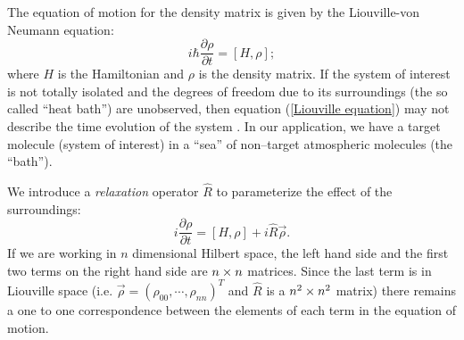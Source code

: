 \label{density formalism}
The equation of motion for the density matrix is given by the Liouville-von Neumann equation:
\begin{equation}
i \hbar \frac{\partial \rho}{\partial t}
=
[H, \rho];
\label{Liouville equation}
\end{equation}
where $H$ is the Hamiltonian and $\rho$ is the density matrix. If the system of interest is not totally isolated and the degrees of freedom due to its surroundings (the so called ``heat bath'') are unobserved, then equation (\ref{Liouville equation}) may not describe the time evolution of the system \cite{Blum:1981a}. In our application, we have a target molecule (system of interest) in a ``sea'' of non--target atmospheric molecules (the ``bath'').

We introduce a \emph{relaxation} operator $\hat{R}$ \cite{Band:1991a} to parameterize the effect of the surroundings:
\begin{equation}
i \frac{\partial \rho}{\partial t}
=
[H, \rho]
+
i \hat{R} \vec{\rho}.
\label{open Liouville equation}
\end{equation}
If we are working in $n$ dimensional Hilbert space, the left hand side and the first two terms on the right hand side are $n\times n$ matrices. Since the last term is in Liouville space (i.e. $\vec{\rho} = (\rho_{00}, \cdots, \rho_{nn})^{T}$ and $\hat{R}$ is a $n^2\times n^2$ matrix) there remains a one to one correspondence between the elements of each term in the equation of motion.

